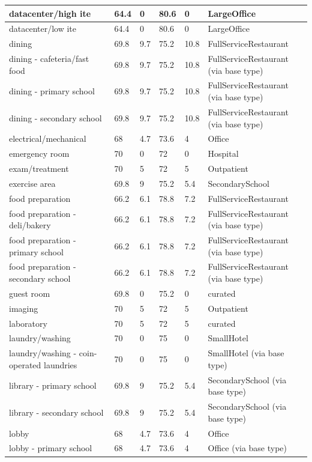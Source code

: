 \begin{center}
\begin{longtable}{|p{2.2in}|p{0.7in}|p{0.7in}|p{0.7in}|p{0.7in}|p{1.2in}|}
datacenter/high ite & 64.4 & 0 & 80.6 & 0 & LargeOffice \\ \hline
datacenter/low ite & 64.4 & 0 & 80.6 & 0 & LargeOffice \\ \hline
dining & 69.8 & 9.7 & 75.2 & 10.8 & FullServiceRestaurant \\ \hline
dining - cafeteria/fast food & 69.8 & 9.7 & 75.2 & 10.8 & FullServiceRestaurant (via base type) \\ \hline
dining - primary school & 69.8 & 9.7 & 75.2 & 10.8 & FullServiceRestaurant (via base type) \\ \hline
dining - secondary school & 69.8 & 9.7 & 75.2 & 10.8 & FullServiceRestaurant (via base type) \\ \hline
electrical/mechanical & 68 & 4.7 & 73.6 & 4 & Office \\ \hline
emergency room & 70 & 0 & 72 & 0 & Hospital \\ \hline
exam/treatment & 70 & 5 & 72 & 5 & Outpatient \\ \hline
exercise area & 69.8 & 9 & 75.2 & 5.4 & SecondarySchool \\ \hline
food preparation & 66.2 & 6.1 & 78.8 & 7.2 & FullServiceRestaurant \\ \hline
food preparation - deli/bakery & 66.2 & 6.1 & 78.8 & 7.2 & FullServiceRestaurant (via base type) \\ \hline
food preparation - primary school & 66.2 & 6.1 & 78.8 & 7.2 & FullServiceRestaurant (via base type) \\ \hline
food preparation - secondary school & 66.2 & 6.1 & 78.8 & 7.2 & FullServiceRestaurant (via base type) \\ \hline
guest room & 69.8 & 0 & 75.2 & 0 & curated \\ \hline
imaging & 70 & 5 & 72 & 5 & Outpatient \\ \hline
laboratory & 70 & 5 & 72 & 5 & curated \\ \hline
laundry/washing & 70 & 0 & 75 & 0 & SmallHotel \\ \hline
laundry/washing - coin-operated laundries & 70 & 0 & 75 & 0 & SmallHotel (via base type) \\ \hline
library - primary school & 69.8 & 9 & 75.2 & 5.4 & SecondarySchool (via base type) \\ \hline
library - secondary school & 69.8 & 9 & 75.2 & 5.4 & SecondarySchool (via base type) \\ \hline
lobby & 68 & 4.7 & 73.6 & 4 & Office \\ \hline
lobby - primary school & 68 & 4.7 & 73.6 & 4 & Office (via base type) \\ \hline

\end{longtable}
\end{center}
